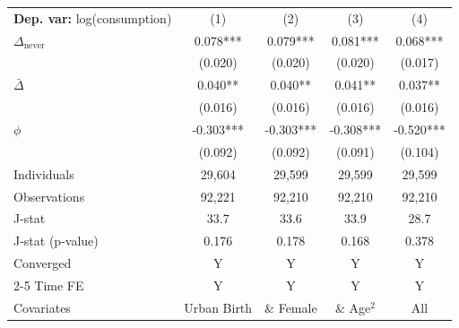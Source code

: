 \begin{tabular}{l cccc} \toprule  \textbf{Dep. var:}  log(consumption) 
                    &\multicolumn{1}{c}{(1)}   &\multicolumn{1}{c}{(2)}   &\multicolumn{1}{c}{(3)}   &\multicolumn{1}{c}{(4)}   \\

\addlinespace
$\Delta_{\text{never}}$&       0.078***&       0.079***&       0.081***&       0.068***\\
                    &     (0.020)   &     (0.020)   &     (0.020)   &     (0.017)   \\

\addlinespace
$\bar{\Delta}$      &       0.040** &       0.040** &       0.041** &       0.037** \\
                    &     (0.016)   &     (0.016)   &     (0.016)   &     (0.016)   \\

\addlinespace
$\phi$              &      -0.303***&      -0.303***&      -0.308***&      -0.520***\\
                    &     (0.092)   &     (0.092)   &     (0.091)   &     (0.104)   \\
\addlinespace
Individuals         &      29,604   &      29,599   &      29,599   &      29,599   \\
Observations        &      92,221   &      92,210   &      92,210   &      92,210   \\
J-stat              &        33.7   &        33.6   &        33.9   &        28.7   \\
J-stat (p-value)    &       0.176   &       0.178   &       0.168   &       0.378   \\
Converged           &           Y   &           Y   &           Y   &           Y   \\
\cmidrule{2-5} Time FE & Y & Y & Y & Y \\ Covariates & Urban Birth & \& Female & \& Age$^2$ & All \\ \bottomrule \end{tabular}
